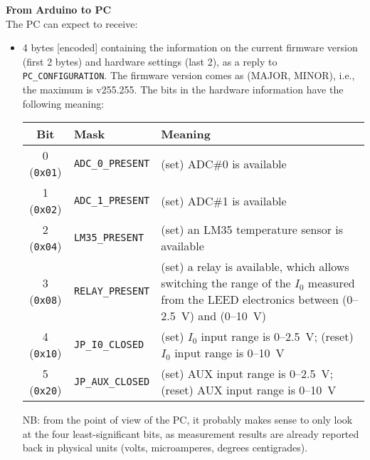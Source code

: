 \documentclass[11pt,a4paper,english]{article}
\begin{document}
\clearpage
\noindent\textbf{From Arduino to PC}\\The PC can expect to receive:
\begin{itemize}
\item 4 bytes [encoded] containing the information on the current firmware version (first 2 bytes) and hardware settings (last 2), as a reply to \texttt{PC\_CONFIGURATION}. The firmware version comes as (MAJOR, MINOR), i.e., the maximum is v255.255. The bits in the hardware information have the following meaning:
	  \begin{center}
	  \begin{tabular}{clp{}}\toprule
	  Bit 				 & Mask                     & Meaning\\
	  \midrule
	  0 (\texttt{0x01})  & \texttt{ADC\_0\_PRESENT} & (set) ADC\#0 is available \\
	  1 (\texttt{0x02})  & \texttt{ADC\_1\_PRESENT} & (set) ADC\#1 is available \\
	  2 (\texttt{0x04})  & \texttt{LM35\_PRESENT}   & (set) an LM35 temperature sensor is available \\
	  3 (\texttt{0x08})  & \texttt{RELAY\_PRESENT}  & (set) a relay is available, which allows switching the range of the $I_0$ measured from the LEED electronics between (0--2.5~V) and (0--10~V)\\
	  4 (\texttt{0x10})  & \texttt{JP\_I0\_CLOSED}  & (set) $I_0$ input range is 0--2.5~V; (reset) $I_0$ input range is 0--10~V\\
	  5 (\texttt{0x20})  & \texttt{JP\_AUX\_CLOSED} & (set) AUX input range is 0--2.5~V; (reset) AUX input range is 0--10~V\\
	  \bottomrule
	  \end{tabular}
	  \end{center}
      
      NB: from the point of view of the PC, it probably makes sense to only look at the four least-significant bits, as measurement results are already reported back in physical units (volts, microamperes, degrees centigrades).


\end{itemize}
\end{document}

